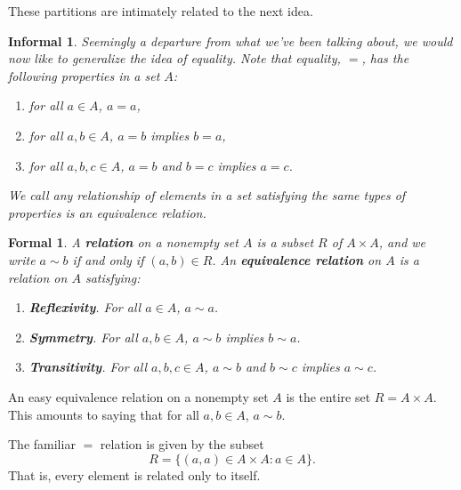 \documentclass{amsart}
\newtheorem*{formal}{Formal}
\newtheorem*{informal}{Informal}
\begin{document}
These partitions are intimately related to the next idea.
\begin{definition}\label{equivrel}
   \begin{informal}
      Seemingly a departure from what we've been talking about, we would now
		like to generalize the idea of equality. Note that equality, \(=\), has
		the following properties in a set \(A\):
		\begin{enumerate}[label=(\roman*)]
			\item for all \(a\in A\), \(a = a\),
			\item for all \(a, b\in A\), \(a = b\) implies \(b = a\),
			\item for all \(a, b, c\in A\), \(a = b\) and \(b = c\) implies \(a =
			c\).
		\end{enumerate}
		We call any relationship of elements in a set satisfying the
		same types of properties is an \emph{equivalence relation}.
   \end{informal}
	\begin{formal}
	   A \textbf{relation} on a nonempty set \(A\) is a subset \(R\) of
	   \(A\times A\), and we write \(a\sim b\) if and only if \((a, b)\in R\). An
		\textbf{equivalence relation} on \(A\) is a relation on \(A\) satisfying:
		\begin{enumerate}[label=(\roman*)]
			\item \textbf{Reflexivity}. For all \(a\in A\), \(a\sim a\).
			\item \textbf{Symmetry}. For all \(a, b\in A\), \(a\sim b\) implies
			\(b\sim a\).
			\item \textbf{Transitivity}. For all \(a, b, c\in A\), \(a\sim b\) and
			\(b\sim c\) implies \(a\sim c\).
		\end{enumerate}
	\end{formal}
\end{definition}

\begin{example}\label{trivrel}
	An easy equivalence relation on a nonempty set \(A\) is the entire set \(R =
	A\times A\). This amounts to saying that for all \(a, b\in A\), \(a\sim b\).
\end{example}

\begin{example}\label{equals}
   The familiar \(=\) relation is given by the subset 
	\[
      R = \{(a, a)\in A\times A : a\in A\}.
   \]
	That is, every element is related only to itself.
\end{example}
\end{document}
